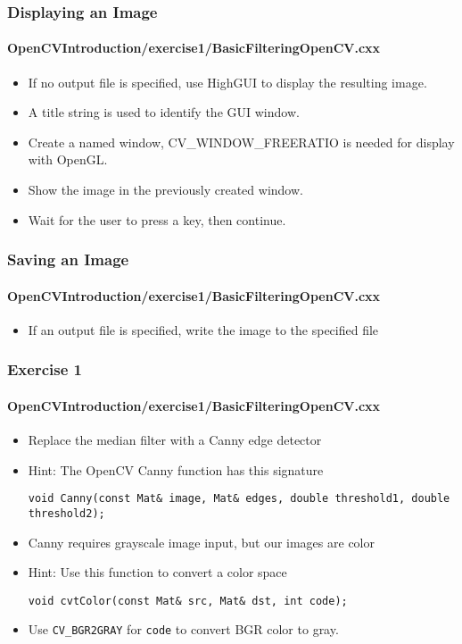 \begin{frame}
\frametitle{Displaying an Image}
\framesubtitle{OpenCVIntroduction/exercise1/BasicFilteringOpenCV.cxx}
\begin{center}
\begin{itemize}
\item If no output file is specified, use HighGUI to display the resulting image.

\pause
\item A title string is used to identify the GUI window.
\item Create a named window, CV\_WINDOW\_FREERATIO is needed for display with OpenGL.
\item Show the image in the previously created window.
\item Wait for the user to press a key, then continue.
\end{itemize}
\end{center}
\end{frame}


\begin{frame}
\frametitle{Saving an Image}
\framesubtitle{OpenCVIntroduction/exercise1/BasicFilteringOpenCV.cxx}
\begin{center}
\begin{itemize}
\item If an output file is specified, write the image to the specified file

\end{itemize}
\end{center}
\end{frame}


\begin{frame}[fragile]
\frametitle{Exercise 1}
\framesubtitle{OpenCVIntroduction/exercise1/BasicFilteringOpenCV.cxx}
\begin{center}
\begin{itemize}
\item Replace the median filter with a Canny edge detector

\pause
\item Hint: The OpenCV Canny function has this signature
\begin{lstlisting}
void Canny(const Mat& image, Mat& edges, double threshold1, double threshold2);
\end{lstlisting}
\pause
\item Canny requires grayscale image input, but our images are color
\item Hint: Use this function to convert a color space
\begin{lstlisting}
void cvtColor(const Mat& src, Mat& dst, int code);
\end{lstlisting}
\item Use {\tt CV\_BGR2GRAY} for {\tt code} to convert BGR color to gray.
\end{itemize}
\end{center}
\end{frame}

